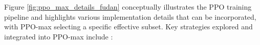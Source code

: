 \documentclass[10pt,journal,compsoc]{IEEEtran} %
\begin{document}
Figure \ref{fig:ppo_max_details_fudan} conceptually illustrates the PPO training pipeline and highlights various implementation details that can be incorporated, with PPO-max selecting a specific effective subset. Key strategies explored and integrated into PPO-max include \cite{Zheng2023PPO}:

\end{document}

